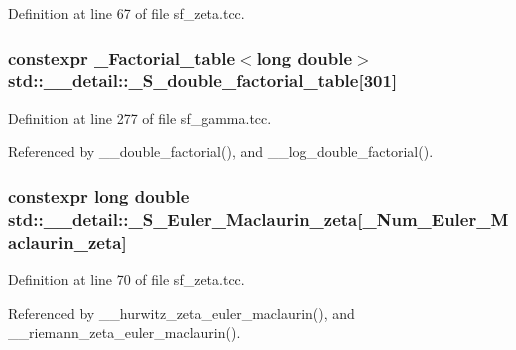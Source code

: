 Definition at line 67 of file sf\+\_\+zeta.\+tcc.

\subsubsection[{\texorpdfstring{\+\_\+\+S\+\_\+double\+\_\+factorial\+\_\+table}{_S_double_factorial_table}}]{\setlength{\rightskip}{0pt plus 5cm}constexpr {\bf \+\_\+\+Factorial\+\_\+table}$<$long double$>$ std\+::\+\_\+\+\_\+detail\+::\+\_\+\+S\+\_\+double\+\_\+factorial\+\_\+table\mbox{[}301\mbox{]}}\hypertarget{namespacestd_1_1____detail_a6d1131fefdb30b2746c76ff801bdc833}{}\label{namespacestd_1_1____detail_a6d1131fefdb30b2746c76ff801bdc833}


Definition at line 277 of file sf\+\_\+gamma.\+tcc.



Referenced by \+\_\+\+\_\+double\+\_\+factorial(), and \+\_\+\+\_\+log\+\_\+double\+\_\+factorial().

\subsubsection[{\texorpdfstring{\+\_\+\+S\+\_\+\+Euler\+\_\+\+Maclaurin\+\_\+zeta}{_S_Euler_Maclaurin_zeta}}]{\setlength{\rightskip}{0pt plus 5cm}constexpr long double std\+::\+\_\+\+\_\+detail\+::\+\_\+\+S\+\_\+\+Euler\+\_\+\+Maclaurin\+\_\+zeta\mbox{[}{\bf \+\_\+\+Num\+\_\+\+Euler\+\_\+\+Maclaurin\+\_\+zeta}\mbox{]}}\hypertarget{namespacestd_1_1____detail_acd941b49595dd03e93c88107ad2f68c2}{}\label{namespacestd_1_1____detail_acd941b49595dd03e93c88107ad2f68c2}


Definition at line 70 of file sf\+\_\+zeta.\+tcc.



Referenced by \+\_\+\+\_\+hurwitz\+\_\+zeta\+\_\+euler\+\_\+maclaurin(), and \+\_\+\+\_\+riemann\+\_\+zeta\+\_\+euler\+\_\+maclaurin().

